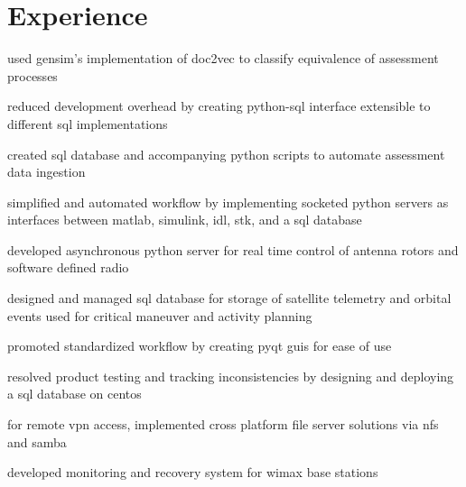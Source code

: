 \begin{minipage}[t]{0.66\textwidth} %


\section{Experience}
\vspace{\topsep}
\begin{tightitemize}
    \item used gensim's implementation of doc2vec to classify equivalence of assessment processes
    \item reduced development overhead by creating python-sql interface extensible to different sql implementations
    \item created sql database and accompanying python scripts to automate assessment data ingestion
\end{tightitemize}


\begin{tightitemize}
    \item simplified and automated workflow by implementing socketed python servers as interfaces between matlab, simulink, idl, stk, and a sql database
    \item developed asynchronous python server for real time control of antenna rotors and software defined radio
    \item designed and managed sql database for storage of satellite telemetry and orbital events used for critical maneuver and activity planning
    \item promoted standardized workflow by creating pyqt guis for ease of use
\end{tightitemize}


\begin{tightitemize}
    \item resolved product testing and tracking inconsistencies by designing and deploying a sql database on centos
    \item for remote vpn access, implemented cross platform file server solutions via nfs and samba
    \item developed monitoring and recovery system for wimax base stations
\end{tightitemize}


\end{minipage}
